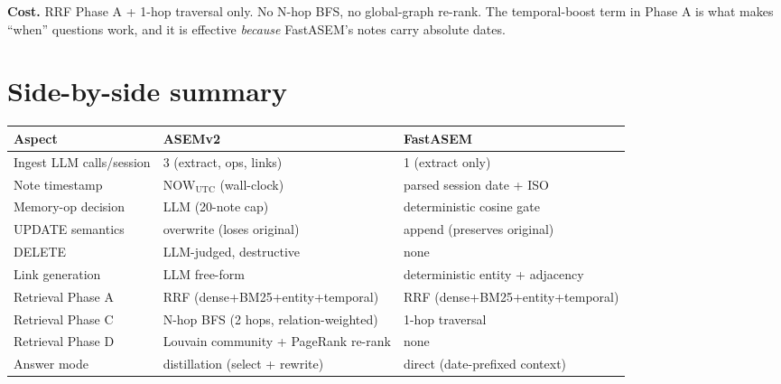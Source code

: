 \documentclass[11pt]{article}
\newcommand{\NOW}{\mathrm{NOW}_{\mathrm{UTC}}}
\begin{document}
\textbf{Cost.} RRF Phase A + 1-hop traversal only. No N-hop BFS, no global-graph re-rank.
The temporal-boost term in Phase A is what makes ``when'' questions work, and it is
effective \emph{because} FastASEM's notes carry absolute dates.

\section*{Side-by-side summary}
\begin{center}
\renewcommand{\arraystretch}{1.2}
\small
\begin{tabular}{p{4.2cm}p{5.2cm}p{5.2cm}}
\toprule
\textbf{Aspect} & \textbf{ASEMv2} & \textbf{FastASEM} \\
\midrule
Ingest LLM calls/session & 3 (extract, ops, links) & 1 (extract only) \\
Note timestamp & $\NOW$ (wall-clock) & parsed session date + ISO \\
Memory-op decision & LLM (20-note cap) & deterministic cosine gate \\
UPDATE semantics & overwrite (loses original) & append (preserves original) \\
DELETE & LLM-judged, destructive & none \\
Link generation & LLM free-form & deterministic entity + adjacency \\
Retrieval Phase A & RRF (dense+BM25+entity+temporal) & RRF (dense+BM25+entity+temporal) \\
Retrieval Phase C & N-hop BFS (2 hops, relation-weighted) & 1-hop traversal \\
Retrieval Phase D & Louvain community + PageRank re-rank & none \\
Answer mode & distillation (select + rewrite) & direct (date-prefixed context) \\
\bottomrule
\end{tabular}
\end{center}
\end{document}
